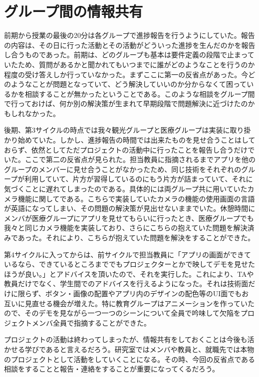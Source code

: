 \section{グループ間の情報共有}
前期から授業の最後の20分は各グループで進捗報告を行うようにしていた。報告の内容は、その日に行った活動とその活動がどういった進捗を生んだのかを報告し合うものであった。前期は、どのグループも基本は要件定義の段階で止まっていたため、質問があるかと聞かれてもいつまでに誰がどのようなことを行うのか程度の受け答えしか行っていなかった。まずここに第一の反省点があった。今どのようなことが問題となっていて、どう解決していいのか分からなくて困っているかを相談することが無かったということである。このような相談をグループ間で行っておけば、何か別の解決策が生まれて早期段階で問題解決に近づけたのかもしれなかった。
\par 後期、第3サイクルの時点では我々観光グループと医療グループは実装に取り掛かり始めていた。しかし、進捗報告の時間では出来たものを見せ合うことはしておらず、依然としてただプロジェクトの活動中に行ったことを報告し合うだけでいた。ここで第二の反省点が見られた。担当教員に指摘されるまでアプリを他のグループのメンバーに見せ合うことがなかったため、同じ技術をそれぞれのグループが利用していて、片方が習得しているのにもう片方が詰まっていて、それに気づくことに遅れてしまったのである。具体的には両グループ共に用いていたカメラ機能に関してである。こちらで実装していたカメラの機能の使用画面の言語が英語になってしまい、その問題の解決策が見出せないままでいた。休憩時間にメンバが医療グループにアプリを見せてもらいに行ったとき、医療グループでも我々と同じカメラ機能を実装しており、さらにこちらの抱えていた問題を解決済みであった。それにより、こちらが抱えていた問題を解決をすることができた。
\par 第4サイクルに入ってからは、前サイクルで担当教員に「アプリの画面ができているなら、できているところまででもプロジェクターとかで映してデモを見せたほうが良い。」とアドバイスを頂いたので、それを実行した。これにより、TAや教員だけでなく、学生間でのアドバイスを行えるようになった。それは技術面だけに限らず、ボタン・画像の配置やアプリ内のデザインの配色等のUI面でもお互いに見直せる機会が増えた。特に教育グループはアニメーションを作っていたので、そのデモを見ながら一つ一つのシーンについて全員で吟味して欠陥をプロジェクトメンバ全員で指摘することができた。
\par プロジェクトの活動は終わってしまったが、情報共有をしておくことは今後も活かせる学びであると言えるだろう。研究室ではメンバや教員と、就職先では本物のプロジェクトとして活動をしていくことになる。その時、今回の反省点である相談をすることと報告・連絡をすることが重要になってくるだろう。
